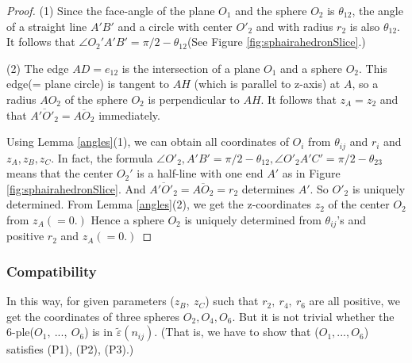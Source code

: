 \documentclass[suppldata, dvipdfmx]{interact}
\theoremstyle{plain}%
\theoremstyle{definition}
\theoremstyle{remark}
\theoremstyle{problemstyle}
\begin{document}
\begin{proof}
 (1) Since the face-angle of the plane $O_1$ and the sphere $O_2$ is
 $\theta_{12}$, the angle of a straight line $A'B'$ and a circle with
 center $O'_2$ and with radius $r_2$ is also $\theta_{12}$. It follows
 that $\angle O_2'A'B' = \pi/2 - \theta_{12}$(See Figure \ref{fig:sphairahedronSlice}.)
 
 (2) The edge $AD = e_{12}$ is the intersection of a plane $O_1$ and a
 sphere $O_2$. This edge(= plane circle) is tangent to $AH$ (which is
 parallel to z-axis) at $A$, so a radius $AO_2$ of the sphere $O_2$ is
 perpendicular to $AH$. It follows that $z_A=z_2$ and that
 $\overline{A'O'_2} = \overline{AO_2}$ immediately.

 Using Lemma \ref{angles}(1), we can obtain all coordinates of $O_i$ from
 $\theta_{ij}$ and $r_i$ and $z_A, z_B, z_C$. In fact, the formula
 $\angle O'_2, A'B' = \pi/2 - \theta_{12}, \angle O'_{2}A'C' = \pi/2 -
 \theta_{23}$ means that the center $O_2'$ is a half-line with one
 end $A'$ as in Figure \ref{fig:sphairahedronSlice}.
 And $\overline{A'O'_2} = \overline{AO_2} = r_2$ determines $A'$.
 So $O'_2$ is uniquely determined. From Lemma \ref{angles}(2), we get the
 z-coordinates $z_2$ of the center $O_2$ from $z_A(=0.)$ Hence a sphere
 $O_2$ is uniquely determined from $\theta_{ij}$'s and positive $r_2$
 and $z_A(= 0.)$
\end{proof}

\subsubsection{Compatibility}
In this way, for given parameters ($z_B,~z_C$) such that $r_2,~r_4,~r_6$
are all positive, we get the coordinates of three spheres 
$O_2, O_4, O_6$. But it is not trivial whether the 6-ple($O_1,~...,~O_6$) is
in $\tilde\varepsilon(n_{ij})$. (That is, we have to show that 
($O_1,..., O_6$) satisfies (P1), (P2), (P3).)
\end{document}
